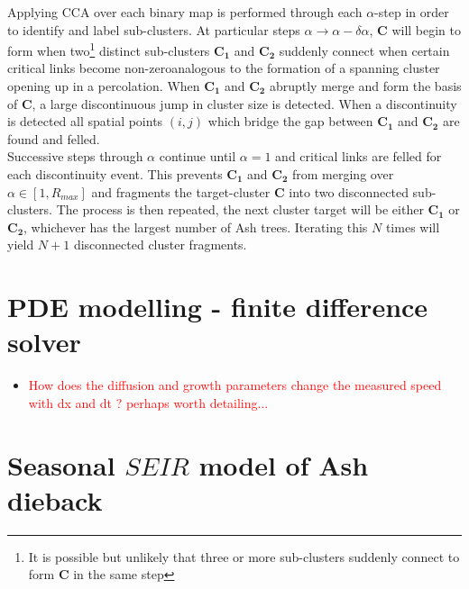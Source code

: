 Applying CCA over each binary map is performed through each $\alpha$-step in order to identify and label sub-clusters. At particular steps $\alpha \rightarrow \alpha - \delta\alpha$, $\mathbf{C}$ will begin to form when two\footnote{It is possible but unlikely that three or more sub-clusters suddenly connect to form $\mathbf{C}$ in the same step} distinct sub-clusters $\mathbf{C_1}$ and $\mathbf{C_2}$ suddenly connect when certain critical links become non-zero\textemdash analogous to the formation of a spanning cluster opening up in a percolation. When $\mathbf{C_1}$ and $\mathbf{C_2}$ abruptly merge and form the basis of $\mathbf{C}$, a large discontinuous jump in cluster size is detected. When a discontinuity is detected all spatial points $(i,j)$ which bridge the gap between $\mathbf{C_1}$ and $\mathbf{C_2}$ are found and felled.\\

Successive steps through $\alpha$ continue until $\alpha=1$ and critical links are felled for each discontinuity event. This prevents $\mathbf{C_1}$ and $\mathbf{C_2}$ from merging over $\alpha \in [1, R_{max}]$ and fragments the target-cluster $\mathbf{C}$ into two disconnected sub-clusters. The process is then repeated, the next cluster target will be either $\mathbf{C_1}$ or $\mathbf{C_2}$, whichever has the largest number of Ash trees. Iterating this $N$ times will yield $N+1$ disconnected cluster fragments.\\

\chapter{PDE modelling - finite difference solver}

\label{a:pde}

\begin{itemize}
    \item \textcolor{red}{How does the diffusion and growth parameters change the measured speed with dx and dt ? perhaps worth detailing...}
\end{itemize}
\blindtext

\blindtext


\chapter{Seasonal $SEIR$ model of Ash dieback}

